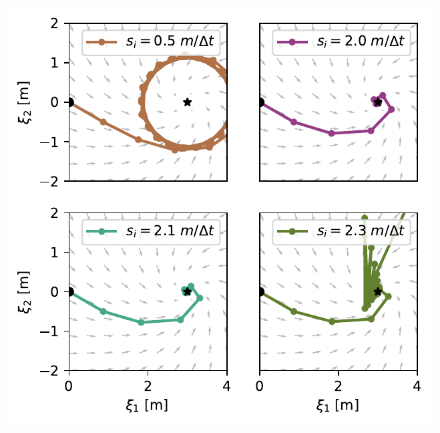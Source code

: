 \begin{figure}[htb]
\centering
  \includegraphics[width=\columnwidth]{figures/discrete_controller_parameters_comparison_stable}
  \label{fig:discrete_controller_parameters_comparison_stable}
\end{figure}


